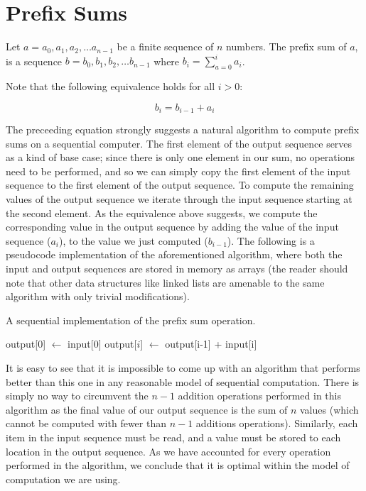 \documentclass[12pt,twoside]{reedthesis}
\begin{document}
\chapter{Prefix Sums}
Let $a = a_0, a_1, a_2, \ldots a_{n-1}$ be a finite sequence of $n$
numbers.  The prefix sum of $a$, is a sequence $b = b_0, b_1, b_2,
\ldots b_{n-1}$ where $b_i = \sum_{a = 0}^i a_i$.



\vspace{1pc}

Note that the following equivalence holds for all $i > 0$:

$$
b_i = b_{i-1} + a_i
$$

The preceeding equation strongly suggests a natural algorithm to
compute prefix sums on a sequential computer. The first element of
the output sequence serves as a kind of base case; since there is
only one element in our sum, no operations need to be performed, and so we can simply copy the first element of the input sequence to the first element of the output sequence.  To compute the remaining values of the output sequence we iterate through the input sequence starting at the second element.  As the equivalence above suggests, we compute the corresponding value in the output sequence by adding the value of the input sequence ($a_i$), to the value we just computed ($b_{i-1}$). The following is a pseudocode implementation of the aforementioned algorithm, where both the input and output sequences are stored in memory as arrays (the reader should note that other data structures like linked lists are amenable to the same algorithm with only trivial modifications).

\begin{algorithm}
\caption{A sequential implementation of the prefix sum operation.}
\begin{algorithmic}
\STATE output[0] $\leftarrow$ input[0]
\STATE output[$i$] $\leftarrow$ output[i-1] + input[i] 
\ENDFOR
\end{algorithmic}
\end{algorithm}

It is easy to see that it is impossible to come up with an algorithm
that performs better than this one in any reasonable model of
sequential computation. There is simply no way to circumvent the $n-1$
addition operations performed in this algorithm as the final
value of our output sequence is the sum of $n$ values (which cannot be
computed with fewer than $n-1$ additions operations). Similarly, each
item in the input sequence must be read, and a value must be stored to
each location in the output sequence.  As we have accounted for every operation performed in the algorithm, we conclude that it is optimal within the model of computation we are using.
\end{document}
